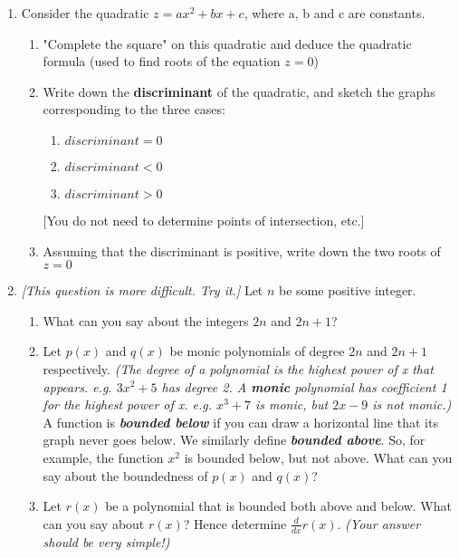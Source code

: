 \documentclass{article}
\begin{document}
\begin{enumerate}
	\item Consider the quadratic $z = ax^2 + bx + c$, where a, b and c are constants.
		\begin{enumerate}
			\item "Complete the square" on this quadratic and deduce the quadratic formula (used to find roots of the equation $z=0$)
			\item Write down the \textbf{discriminant} of the quadratic, and sketch the graphs corresponding to the three cases:
				\begin{enumerate}
					\item $discriminant = 0$
					\item $discriminant < 0$
					\item $discriminant > 0$
				\end{enumerate}
				[You do not need to determine points of intersection, etc.]
			\item Assuming that the discriminant is positive, write down the two roots of $z = 0$
		\end{enumerate}
	
	\item \textit{[This question is more difficult.  Try it.]}
	Let $n$ be some positive integer.
		\begin{enumerate}
			\item What can you say about the integers $2n$ and $2n+1$?
			\item Let $p(x)$ and $q(x)$ be monic polynomials of degree $2n$ and $2n+1$ respectively.  \textit{(The degree of a polynomial is the highest power of x that appears.  e.g. $3x^2 + 5$ has degree 2.  A \textbf{monic} polynomial has coefficient 1 for the highest power of x. e.g. $x^3+7$ is monic, but $2x - 9$ is not monic.)}  A function is \textit{\textbf{bounded below}} if you can draw a horizontal line that its graph never goes below.  We similarly define \textit{\textbf{bounded above}}.  So, for example, the function $x^2$ is bounded below, but not above.  What can you say about the boundedness of $p(x)$ and $q(x)$?
			\item Let $r(x)$ be a polynomial that is bounded both above and below.  What can you say about $r(x)$?  Hence determine $\frac{d}{dx} r(x)$. \textit{(Your answer should be very simple!)}
		\end{enumerate}

\end{enumerate}
\end{document}

